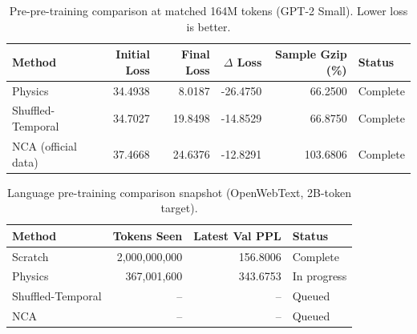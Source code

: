 \begin{table}[t]
\centering
\caption{Pre-pre-training comparison at matched 164M tokens (GPT-2 Small). Lower loss is better.}
\label{tab:ppt_comparison}
\begin{tabular}{lrrrrl}
\hline
Method & Initial Loss & Final Loss & $\Delta$ Loss & Sample Gzip (\%) & Status \\
\hline
Physics & 34.4938 & 8.0187 & -26.4750 & 66.2500 & Complete \\
Shuffled-Temporal & 34.7027 & 19.8498 & -14.8529 & 66.8750 & Complete \\
NCA (official data) & 37.4668 & 24.6376 & -12.8291 & 103.6806 & Complete \\
\hline
\end{tabular}
\end{table}

\begin{table}[t]
\centering
\caption{Language pre-training comparison snapshot (OpenWebText, 2B-token target).}
\label{tab:lang_progress_snapshot}
\begin{tabular}{lrrl}
\hline
Method & Tokens Seen & Latest Val PPL & Status \\
\hline
Scratch & 2,000,000,000 & 156.8006 & Complete \\
Physics & 367,001,600 & 343.6753 & In progress \\
Shuffled-Temporal & -- & -- & Queued \\
NCA & -- & -- & Queued \\
\hline
\end{tabular}
\end{table}

